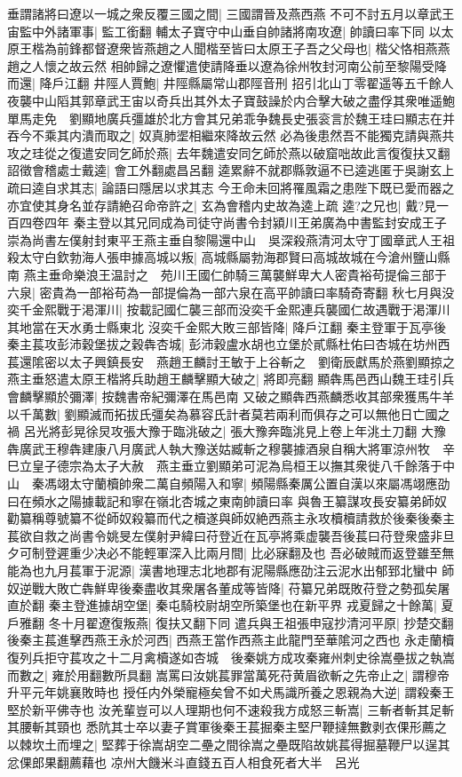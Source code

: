 垂謂諸將曰遼以一城之衆反覆三國之間|{
	三國謂晉及燕西燕}
不可不討五月以章武王宙監中外諸軍事|{
	監工銜翻}
輔太子寶守中山垂自帥諸將南攻遼|{
	帥讀曰率下同}
以太原王楷為前鋒都督遼衆皆燕趙之人聞楷至皆曰太原王子吾之父母也|{
	楷父恪相燕燕趙之人懷之故云然}
相帥歸之遼懼遣使請降垂以遼為徐州牧封河南公前至黎陽受降而還|{
	降戶江翻}
井陘人賈鮑|{
	井陘縣屬常山郡陘音刑}
招引北山丁零翟遥等五千餘人夜襲中山䧟其郭章武王宙以奇兵出其外太子寶鼓譟於内合擊大破之盡俘其衆唯遥鮑單馬走免　劉顯地廣兵彊雄於北方會其兄弟乖争魏長史張衮言於魏王珪曰顯志在并吞今不乘其内潰而取之|{
	奴真肺埿相繼來降故云然}
必為後患然吾不能獨克請與燕共攻之珪從之復遣安同乞師於燕|{
	去年魏遣安同乞師於燕以破窟咄故此言復復扶又翻}
詔徵會稽處士戴逵|{
	會工外翻處昌呂翻}
逵累辭不就郡縣敦逼不已逵逃匿于吳謝玄上疏曰逵自求其志|{
	論語曰隱居以求其志}
今王命未回將罹風霜之患陛下既已愛而器之亦宜使其身名並存請絶召命帝許之|{
	玄為會稽内史故為逵上疏}
逵?之兄也|{
	戴?見一百四卷四年}
秦主登以其兄同成為司徒守尚書令封潁川王弟廣為中書監封安成王子崇為尚書左僕射封東平王燕主垂自黎陽還中山　吳深殺燕清河太守丁國章武人王祖殺太守白欽勃海人張申據高城以叛|{
	高城縣屬勃海郡賢曰高城故城在今滄州鹽山縣南}
燕主垂命樂浪王温討之　苑川王國仁帥騎三萬襲鮮卑大人密貴裕苟提倫三部于六泉|{
	密貴為一部裕苟為一部提倫為一部六泉在高平帥讀曰率騎奇寄翻}
秋七月與没奕千金熙戰于渇渾川|{
	按載記國仁襲三部而没奕千金熙連兵襲國仁故遇戰于渇渾川其地當在天水勇士縣東北}
沒奕千金熙大敗三部皆降|{
	降戶江翻}
秦主登軍于瓦亭後秦主萇攻彭沛穀堡拔之穀犇杏城|{
	彭沛穀盧水胡也立堡於貳縣杜佑曰杏城在坊州西}
萇還隂密以太子興鎮長安　燕趙王麟討王敏于上谷斬之　劉衛辰獻馬於燕劉顯掠之燕主垂怒遣太原王楷將兵助趙王麟擊顯大破之|{
	將即亮翻}
顯犇馬邑西山魏王珪引兵會麟擊顯於彌澤|{
	按魏書帝紀彌澤在馬邑南}
又破之顯犇西燕麟悉收其部衆獲馬牛羊以千萬數|{
	劉顯滅而拓拔氏彊矣為慕容氏計者莫若兩利而俱存之可以無他日亡國之禍}
呂光將彭晃徐炅攻張大豫于臨洮破之|{
	張大豫奔臨洮見上卷上年洮土刀翻}
大豫犇廣武王穆犇建康八月廣武人執大豫送姑臧斬之穆襲據酒泉自稱大將軍涼州牧　辛巳立皇子德宗為太子大赦　燕主垂立劉顯弟可泥為烏桓王以撫其衆徙八千餘落于中山　秦馮翊太守蘭櫝帥衆二萬自頻陽入和寧|{
	頻陽縣秦厲公置自漢以來屬馮翊應劭曰在頻水之陽據載記和寧在嶺北杏城之東南帥讀曰率}
與魯王纂謀攻長安纂弟師奴勸纂稱尊號纂不從師奴殺纂而代之櫝遂與師奴絶西燕主永攻櫝櫝請救於後秦後秦主萇欲自救之尚書令姚旻左僕射尹緯曰苻登近在瓦亭將乘虚襲吾後萇曰苻登衆盛非旦夕可制登遲重少决必不能輕軍深入比兩月間|{
	比必寐翻及也}
吾必破賊而返登雖至無能為也九月萇軍于泥源|{
	漢書地理志北地郡有泥陽縣應劭注云泥水出郁郅北蠻中}
師奴逆戰大敗亡犇鮮卑後秦盡收其衆屠各董成等皆降|{
	苻纂兄弟既敗苻登之勢孤矣屠直於翻}
秦主登進據胡空堡|{
	秦屯騎校尉胡空所築堡也在新平界}
戎夏歸之十餘萬|{
	夏戶雅翻}
冬十月翟遼復叛燕|{
	復扶又翻下同}
遣兵與王祖張申寇抄清河平原|{
	抄楚交翻}
後秦主萇進擊西燕王永於河西|{
	西燕王當作西燕主此龍門至華隂河之西也}
永走蘭櫝復列兵拒守萇攻之十二月禽櫝遂如杏城　後秦姚方成攻秦雍州刺史徐嵩壘拔之執嵩而數之|{
	雍於用翻數所具翻}
嵩罵曰汝姚萇罪當萬死苻黄眉欲斬之先帝止之|{
	謂穆帝升平元年姚襄敗時也}
授任内外榮寵極矣曾不如犬馬識所養之恩親為大逆|{
	謂殺秦王堅於新平佛寺也}
汝羌輩豈可以人理期也何不速殺我方成怒三斬嵩|{
	三斬者斬其足斬其腰斬其頸也}
悉阬其士卒以妻子賞軍後秦王萇掘秦主堅尸鞭撻無數剥衣倮形薦之以棘坎土而埋之|{
	堅葬于徐嵩胡空二壘之間徐嵩之壘既陷故姚萇得掘墓鞭尸以逞其忿倮郎果翻薦藉也}
凉州大饑米斗直錢五百人相食死者大半　呂光

